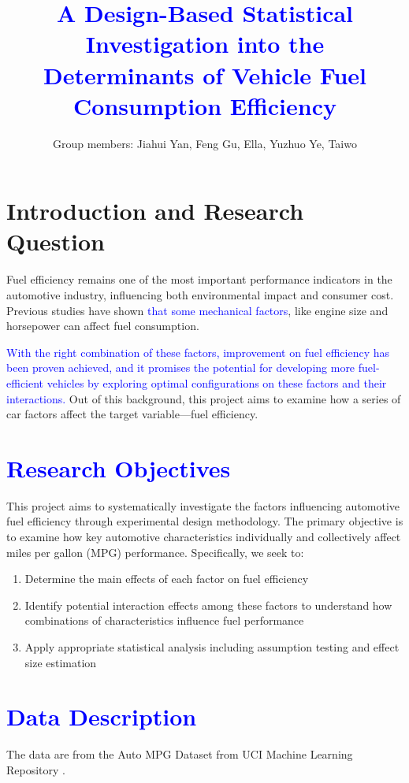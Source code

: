 \documentclass[12pt]{article}
\title{\textcolor{blue}{A Design-Based Statistical Investigation into the Determinants of Vehicle Fuel Consumption Efficiency}}
\author{Group members: Jiahui Yan, Feng Gu, Ella, Yuzhuo Ye, Taiwo}
\date{}
\begin{document}
\maketitle

\section{Introduction and Research Question}

Fuel efficiency remains one of the most important performance indicators in the automotive industry,
influencing both environmental impact and consumer cost. Previous studies \cite{ahmad2020, greene2017}
have shown \textcolor{blue}{that some mechanical factors}, like engine size and horsepower can affect fuel consumption.

\textcolor{blue}{With the right combination of these factors, improvement on fuel efficiency has been proven achieved,
and it promises the potential for developing more fuel-efficient vehicles by exploring optimal 
configurations on these factors and their interactions.}
Out of this background, this project aims to examine how a series of car factors affect the target variable---fuel efficiency. 

\section{\textcolor{blue}{Research Objectives}}

This project aims to systematically investigate the factors influencing automotive fuel efficiency through
experimental design methodology. The primary objective is to examine how key automotive characteristics individually
and collectively affect miles per gallon (MPG) performance. Specifically, we seek to:
\begin{enumerate}
    \item Determine the main effects of each factor on fuel efficiency
    \item Identify potential interaction effects among these factors to understand how combinations of characteristics influence fuel performance
    \item Apply appropriate statistical analysis including assumption testing and effect size estimation
\end{enumerate}


\section{\textcolor{blue}{Data Description}}
The data are from the Auto MPG Dataset from UCI Machine Learning Repository \cite{uciml2021autompg}.
\end{document}
